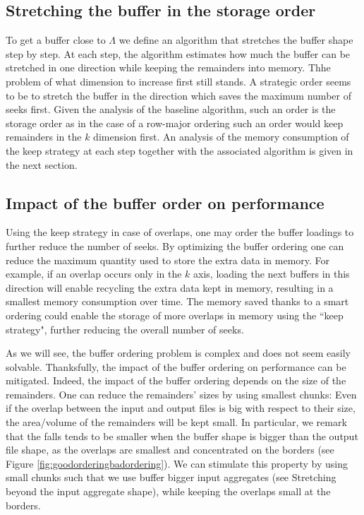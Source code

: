 \documentclass[conference]{IEEEtran}
\begin{document}
\subsection{Stretching the buffer in the storage order}
To get a buffer close to $\Lambda$ we define an algorithm that stretches the
buffer shape step by step. At each step, the algorithm estimates how much the
buffer can be stretched in one direction while keeping the remainders into
memory. Thhe problem of what dimension to increase first still stands. A
strategic order seems to be to stretch the buffer in the direction which saves
the maximum number of seeks first. Given the analysis of the baseline algorithm,
such an order is the storage order as in the case of a row-major ordering such
an order would keep remainders in the $k$ dimension first. An analysis of the
memory consumption of the keep strategy at each step together with the associated
algorithm is given in the next section.

\subsection{Impact of the buffer order on performance}
Using the keep strategy in case of overlaps, one may order the buffer loadings
to further reduce the number of seeks. By optimizing the buffer ordering one can
reduce the maximum quantity used to store the extra data in memory. For example,
if an overlap occurs only in the $k$ axis, loading the next buffers in this
direction will enable recycling the extra data kept in memory, resulting in a
smallest memory consumption over time. The memory saved thanks to a smart
ordering could enable the storage of more overlaps in memory using the
``keep strategy", further reducing the overall number of seeks.

As we will see, the buffer ordering problem is complex and does not seem easily
solvable. Thanksfully, the impact of the buffer ordering on performance can be
mitigated. Indeed, the impact of the buffer ordering depends on the size of the
remainders. One can reduce the remainders' sizes by using smallest chunks: Even
if the overlap between the input and output files is big with respect to their
size, the area/volume of the remainders will be kept small. In particular, we
remark that the falls tends to be smaller when the buffer shape is bigger than
the output file shape, as the overlaps are smallest and concentrated on the
borders (see Figure \ref{fig:goodorderingbadordering}). We can stimulate this
property by using small chunks such that we use buffer bigger input aggregates
(see Stretching beyond the input aggregate shape), while keeping the overlaps
small at the borders.
\end{document}

